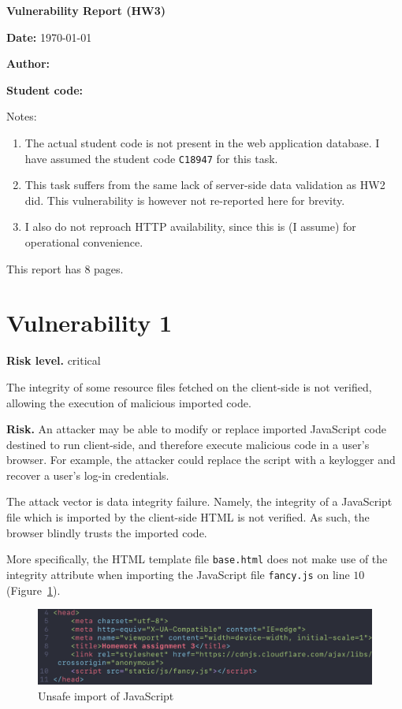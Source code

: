 \documentclass[parskip=half]{scrartcl}
\newcommand{\figref}[1]{Figure~\ref{#1}}
\begin{document}
{\LARGE \textbf{\textsf{Vulnerability Report (HW3)}}}
\vspace*{1em}

\textbf{Date:} \today

\textbf{Author:} \docauthor

\textbf{Student code:} \texttt{\studentcode}

Notes:
\begin{enumerate}
    \item The actual student code is not present in the web application
    database. I have assumed the student code \texttt{C18947} for this task.

    \item This task suffers from the same lack of server-side data validation
    as HW2 did. This vulnerability is however not re-reported here for brevity.
    
    \item I also do not reproach HTTP availability, since this is (I assume)
    for operational convenience.
\end{enumerate}

This report has $8$ pages.

\section*{Vulnerability 1}\label{vuln1}

\textbf{Risk level.} critical

The integrity of some resource files fetched on the client-side is not
verified, allowing the execution of malicious imported code.

\textbf{Risk.} An attacker may be able to modify or replace imported JavaScript
code destined to run client-side, and therefore execute malicious code in a
user's browser. For example, the attacker could replace the script with a 
keylogger and recover a user's log-in credentials.

The attack vector is data integrity failure. Namely, the integrity of a
JavaScript file which is imported by the client-side HTML is not verified. As
such, the browser blindly trusts the imported code.

More specifically, the HTML template file \texttt{base.html} does not make
use of the integrity attribute when importing the JavaScript file
\texttt{fancy.js} on line $10$ (\figref{fig:code:lackverif}).

\begin{figure}[h]
    \centering
    \includegraphics[width=\textwidth]{lackverif}
    \caption{Unsafe import of JavaScript}
    \label{fig:code:lackverif}
\end{figure}
\end{document}
